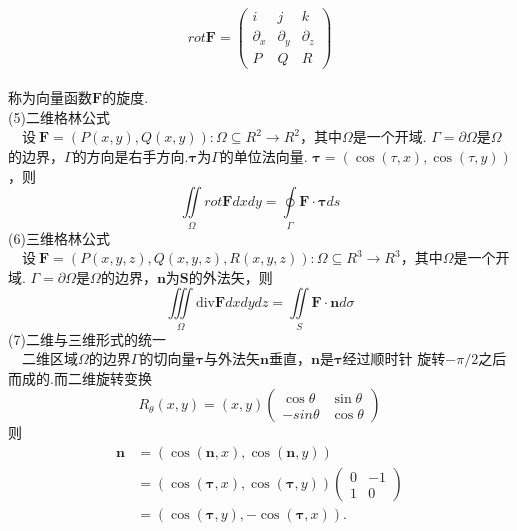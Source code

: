 \documentclass[UTF8]{ctexart}
\begin{document}
\begin{equation*}
rot\bm F=\begin{pmatrix} i & j & k \\ \partial_x & \partial_y & \partial_z \\P & Q & R \end{pmatrix}
\end{equation*}\\
称为向量函数$\bm F$的旋度.\\
(5)二维格林公式\\
~~设$\ \bm F=(P(x,y),Q(x,y)):\Omega\subseteq R^2\rightarrow R^2$，其中$\Omega$是一个开域.
$\Gamma=\partial\Omega$是$\Omega$的边界，$\Gamma$的方向是右手方向.$\bm \tau$为$\Gamma$的单位法向量.
$\bm \tau=(\cos(\tau,x),\cos(\tau,y))$，则\\
\begin{equation*}
\iint\limits_\Omega rot\bm F dxdy=\oint\limits_\Gamma \bm F \cdot\bm \tau ds 
\end{equation*}
(6)三维格林公式\\
~~设$\ \bm F=(P(x,y,z),Q(x,y,z),R(x,y,z)):\Omega\subseteq R^3\rightarrow R^3$，其中$\Omega$是一个开域.
$\Gamma=\partial\Omega$是$\Omega$的边界，$\bm n$为$\bm S$的外法矢，则\\
\begin{equation*}
\iiint\limits_\Omega \mathrm{div}\bm F dxdydz=\iint\limits_S \bm F\cdot\bm n d\sigma 
\end{equation*}
(7)二维与三维形式的统一\\
~~二维区域$\Omega$的边界$\Gamma$的切向量$\bm \tau$与外法矢$\bm n$垂直，$\bm n$是$\bm \tau$经过顺时针
旋转$-\pi/2$之后而成的.而二维旋转变换\\
\begin{equation*}
R_\theta(x,y)=(x,y)\begin{pmatrix}\cos\theta &\sin\theta \\-sin\theta & \cos\theta\end{pmatrix}
\end{equation*}
则\\
\begin{equation*}
\begin{split}\bm{n}&=(\cos(\bm{n},x),\cos(\bm{n},y))\\
&=(\cos(\bm{\tau},x),\cos(\bm{\tau},y))\begin{pmatrix}0&-1\\1&0\end{pmatrix}\\
&=(\cos(\bm{\tau},y),-\cos(\bm{\tau},x)).
\end{split}
\end{equation*}\\
\end{document}
